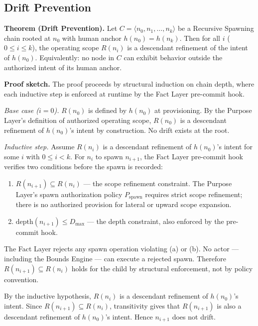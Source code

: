 \subsection{Drift Prevention}
\label{sec:rs-drift-prevention-proof}

\medskip
\noindent\textbf{Theorem (Drift Prevention).} Let $C = \langle n_0, n_1, \ldots, n_k \rangle$ be a Recursive Spawning chain rooted at $n_0$ with human anchor $h(n_0) = h(n_k)$. Then for all $i$ ($0 \leq i \leq k$), the operating scope $R(n_i)$ is a descendant refinement of the intent of $h(n_0)$. Equivalently: no node in $C$ can exhibit behavior outside the authorized intent of its human anchor.

\medskip
\noindent\textbf{Proof sketch.} The proof proceeds by structural induction on chain depth, where each inductive step is enforced at runtime by the Fact Layer pre-commit hook.

\medskip
\textit{Base case ($i=0$).} $R(n_0)$ is defined by $h(n_0)$ at provisioning. By the Purpose Layer's definition of authorized operating scope, $R(n_0)$ is a descendant refinement of $h(n_0)$'s intent by construction. No drift exists at the root.

\medskip
\textit{Inductive step.} Assume $R(n_i)$ is a descendant refinement of $h(n_0)$'s intent for some $i$ with $0 \leq i < k$. For $n_i$ to spawn $n_{i+1}$, the Fact Layer pre-commit hook verifies two conditions before the spawn is recorded:

\begin{enumerate}
    \item[(a)] $R(n_{i+1}) \subseteq R(n_i)$ — the scope refinement constraint. The Purpose Layer's spawn authorization policy $P_{\mathrm{spawn}}$ requires strict scope refinement; there is no authorized provision for lateral or upward scope expansion.
    \item[(b)] $\mathrm{depth}(n_{i+1}) \leq D_{\mathrm{max}}$ — the depth constraint, also enforced by the pre-commit hook.
\end{enumerate}

The Fact Layer rejects any spawn operation violating (a) or (b). No actor — including the Bounds Engine — can execute a rejected spawn. Therefore $R(n_{i+1}) \subseteq R(n_i)$ holds for the child by structural enforcement, not by policy convention.

By the inductive hypothesis, $R(n_i)$ is a descendant refinement of $h(n_0)$'s intent. Since $R(n_{i+1}) \subseteq R(n_i)$, transitivity gives that $R(n_{i+1})$ is also a descendant refinement of $h(n_0)$'s intent. Hence $n_{i+1}$ does not drift.

